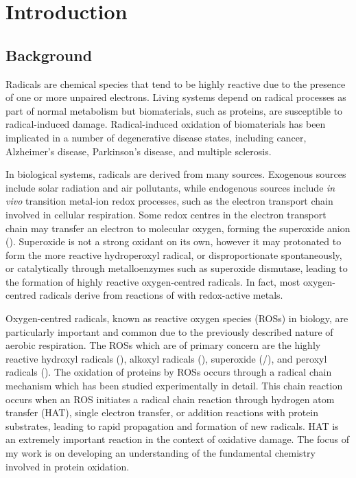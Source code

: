 
\chapter{Introduction}

\section{Background}

Radicals are chemical species that tend to be highly reactive due to the presence of one or more unpaired electrons. Living systems depend on radical processes as part of normal metabolism\cite{Halliwell2015} but biomaterials, such as proteins, are susceptible to radical-induced damage. Radical-induced oxidation of biomaterials has been implicated in a number of degenerative disease states, including cancer, Alzheimer's disease, Parkinson's disease, and multiple sclerosis.\cite{Barnham2004, Valko2007, Hwang2013, Halliwell2007}

In biological systems, radicals are derived from many sources. Exogenous sources include solar radiation and air pollutants, while endogenous sources include \emph{in vivo} transition metal-ion redox processes, such as the electron transport chain involved in cellular respiration.\cite{Turrens2003} Some redox centres in the electron transport chain may transfer an electron to molecular oxygen, forming the superoxide anion (). Superoxide is not a strong oxidant on its own, however it may protonated to form the more reactive hydroperoxyl radical,\cite{Kozmer2014} or disproportionate spontaneously, or catalytically through metalloenzymes such as superoxide dismutase, leading to the formation of highly reactive oxygen-centred radicals. In fact, most oxygen-centred radicals derive from reactions of  with redox-active metals.\cite{Halliwell2015}

Oxygen-centred radicals, known as reactive oxygen species (ROSs) in biology, are particularly important and common due to the previously described nature of aerobic respiration. The ROSs which are of primary concern are the highly reactive hydroxyl radicals (), alkoxyl radicals (), superoxide (/), and peroxyl radicals ().\cite{Halliwell2015} The oxidation of proteins by ROSs occurs through a radical chain mechanism which has been studied experimentally in detail.\cite{Berlett1997, Davies2016} This chain reaction occurs when an ROS initiates a radical chain reaction through hydrogen atom transfer (HAT), single electron transfer, or addition reactions with protein substrates, leading to rapid propagation and formation of new radicals. HAT is an extremely important reaction in the context of oxidative damage. The focus of my work is on developing an understanding of the fundamental chemistry involved in protein oxidation.

